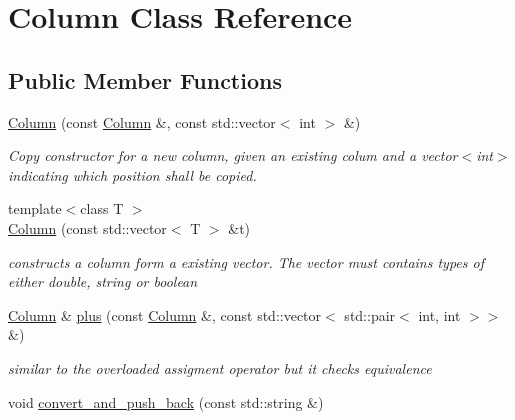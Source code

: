 \hypertarget{classColumn}{}\section{Column Class Reference}
\label{classColumn}
\subsection*{Public Member Functions}
\begin{DoxyCompactItemize}
\item 
\mbox{\label{classColumn_a10196a56bf17147b81a40aac7eda70f8}} 
\hyperlink{classColumn_a10196a56bf17147b81a40aac7eda70f8}{Column} (const \hyperlink{classColumn}{Column} \&, const std\+::vector$<$ int $>$ \&)
\begin{DoxyCompactList}\small\item\em Copy constructor for a new column, given an existing colum and a vector$<$int$>$ indicating which position shall be copied. \end{DoxyCompactList}\item 
\mbox{\label{classColumn_ab9bd37fa800223b400c0a1158ca244e1}} 
{\footnotesize template$<$class T $>$ }\\\hyperlink{classColumn_ab9bd37fa800223b400c0a1158ca244e1}{Column} (const std\+::vector$<$ T $>$ \&t)
\begin{DoxyCompactList}\small\item\em constructs a column form a existing vector. The vector must contains types of either double, string or boolean \end{DoxyCompactList}\item 
\mbox{\label{classColumn_af4232d458c38e5a2c5a75c660664e105}} 
\hyperlink{classColumn}{Column} \& \hyperlink{classColumn_af4232d458c38e5a2c5a75c660664e105}{plus} (const \hyperlink{classColumn}{Column} \&, const std\+::vector$<$ std\+::pair$<$ int, int $>$$>$ \&)
\begin{DoxyCompactList}\small\item\em similar to the overloaded assigment operator but it checks equivalence \end{DoxyCompactList}\item 
void \hyperlink{classColumn_a9a318e80a0581ab65f1ec81499064bc4}{convert\+\_\+and\+\_\+push\+\_\+back} (const std\+::string \&)
\item 
$$
\end{DoxyCompactItemize}
